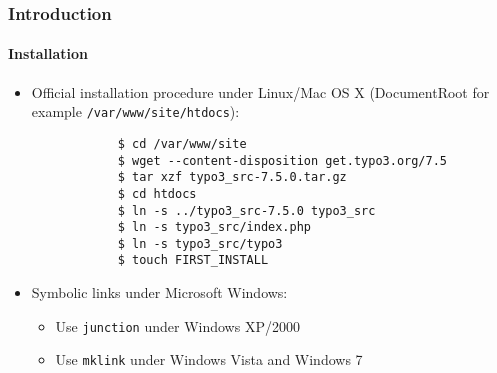 \begin{frame}[fragile]
	\frametitle{Introduction}
	\framesubtitle{Installation}

	\begin{itemize}
		\item Official installation procedure under Linux/Mac OS X\newline
			(DocumentRoot for example \texttt{/var/www/site/htdocs}):
		\begin{lstlisting}
			$ cd /var/www/site
			$ wget --content-disposition get.typo3.org/7.5
			$ tar xzf typo3_src-7.5.0.tar.gz
			$ cd htdocs
			$ ln -s ../typo3_src-7.5.0 typo3_src
			$ ln -s typo3_src/index.php
			$ ln -s typo3_src/typo3
			$ touch FIRST_INSTALL
		\end{lstlisting}

		\item Symbolic links under Microsoft Windows:

			\begin{itemize}
				\item Use \texttt{junction} under Windows XP/2000
				\item Use \texttt{mklink} under Windows Vista and Windows 7
			\end{itemize}

	\end{itemize}
\end{frame}

